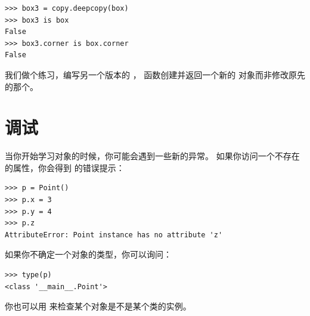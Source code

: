 \begin{lstlisting}
>>> box3 = copy.deepcopy(box)
>>> box3 is box
False
>>> box3.corner is box.corner
False
\end{lstlisting}

%


我们做个练习，编写另一个版本的  ，
函数创建并返回一个新的  对象而非修改原先的那个。

\section{调试}
\label{hasattr}


当你开始学习对象的时候，你可能会遇到一些新的异常。
如果你访问一个不存在的属性，你会得到  的错误提示：

  

\begin{lstlisting}
>>> p = Point()
>>> p.x = 3
>>> p.y = 4
>>> p.z
AttributeError: Point instance has no attribute 'z'
\end{lstlisting}

%

如果你不确定一个对象的类型，你可以询问：

  

\begin{lstlisting}
>>> type(p)
<class '__main__.Point'>
\end{lstlisting}

%

你也可以用  来检查某个对象是不是某个类的实例。

  

